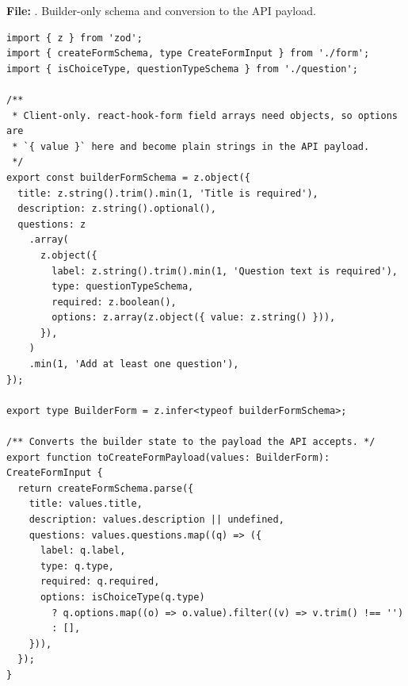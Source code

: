 \documentclass[11pt,a4paper]{article}
\begin{document}
\textbf{File:} . Builder-only schema and conversion to the API payload.\par
\begin{lstlisting}
import { z } from 'zod';
import { createFormSchema, type CreateFormInput } from './form';
import { isChoiceType, questionTypeSchema } from './question';

/**
 * Client-only. react-hook-form field arrays need objects, so options are
 * `{ value }` here and become plain strings in the API payload.
 */
export const builderFormSchema = z.object({
  title: z.string().trim().min(1, 'Title is required'),
  description: z.string().optional(),
  questions: z
    .array(
      z.object({
        label: z.string().trim().min(1, 'Question text is required'),
        type: questionTypeSchema,
        required: z.boolean(),
        options: z.array(z.object({ value: z.string() })),
      }),
    )
    .min(1, 'Add at least one question'),
});

export type BuilderForm = z.infer<typeof builderFormSchema>;

/** Converts the builder state to the payload the API accepts. */
export function toCreateFormPayload(values: BuilderForm): CreateFormInput {
  return createFormSchema.parse({
    title: values.title,
    description: values.description || undefined,
    questions: values.questions.map((q) => ({
      label: q.label,
      type: q.type,
      required: q.required,
      options: isChoiceType(q.type)
        ? q.options.map((o) => o.value).filter((v) => v.trim() !== '')
        : [],
    })),
  });
}
\end{lstlisting}
\end{document}
